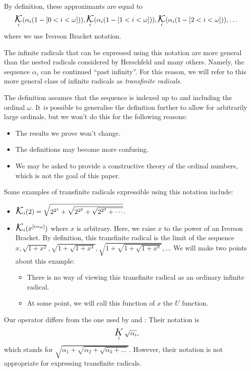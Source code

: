 \documentclass[
]{article}
\providecommand{\tightlist}{%
  \setlength{\itemsep}{0pt}\setlength{\parskip}{0pt}}
\DeclareMathOperator*{\kap}{\text{\Large{$\mathcal K$}}}
\theoremstyle{theorem}
\theoremstyle{lemma}
\theoremstyle{corollary}
\theoremstyle{remark}
\theoremstyle{definition}
\begin{document}
By definition, these approximants are equal to \[\kap_i(\alpha_i(1-[0<i<\omega])), \kap_i(\alpha_i(1-[1<i<\omega])), \kap_i(\alpha_i(1-[2<i<\omega])), \dotsc\] where we use Iverson Bracket notation.

The infinite radicals that can be expressed using this notation are more general than the nested radicals considered by Herschfeld and many others. Namely, the sequence \(\alpha_i\) can be continued ``past infinity''. For this reason, we will refer to this more general class of infinite radicals as \emph{transfinite radicals}.

The definition assumes that the sequence is indexed up to and including the ordinal \(\omega\). It \emph{is} possible to generalise the definition further to allow for arbitrarily large ordinals, but we won't do this for the following reasons:

\begin{itemize}
\tightlist
\item
  The results we prove won't change.
\item
  The definitions may become more confusing.
\item
  We may be asked to provide a constructive theory of the ordinal numbers, which is not the goal of this paper.
\end{itemize}

Some examples of transfinite radicals expressible using this notation include:

\begin{itemize}
\tightlist
\item
  \(\kap_{i}(2) = \sqrt{2^{2^1} + \sqrt{2^{2^2} + \sqrt{2^{2^3} + \dotsb}}}\).
\item
  \(\kap_{i}(x^{[i = \omega]})\) where \(x\) is arbitrary. Here, we raise \(x\) to the power of an Iverson Bracket. By definition, this transfinite radical is the limit of the sequence \(x, \sqrt{1 + x^2}, \sqrt{1 + \sqrt{1 + x^4}}, \sqrt{1 + \sqrt{1 + \sqrt{1 + x^8}}},\dotsc\) We will make two points about this example:

  \begin{itemize}
  \tightlist
  \item
    There is no way of viewing this transfinite radical as an ordinary infinite radical.
  \item
    At some point, we will call this function of \(x\) the \(U\) function.
  \end{itemize}
\end{itemize}

Our operator differs from the one used by \cite{continuedReciprocalRoots} and \cite{kersten1992entwicklungssaetze}: Their notation is \[\mathop{\mathrm{\text{\Large{$K$}}}}_{i}\sqrt{\alpha_i},\] which stands for \(\sqrt{\alpha_1 + \sqrt{\alpha_2 + \sqrt{\alpha_3 + \dotsc}}}\). However, their notation is not appropriate for expressing transfinite radicals.
\end{document}
